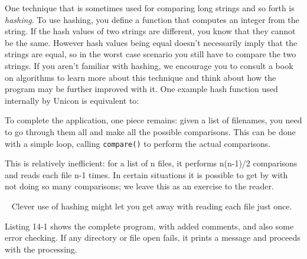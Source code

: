 One technique that is sometimes used for comparing long strings and so
forth is \textit{hashing}. To use hashing, you define a
function that computes an integer from the string. If the hash values
of two strings are different, you know that they cannot be the same.
However hash values being equal doesn't necessarily
imply that the strings are equal, so in the worst case scenario you
still have to compare the two strings. If you aren't
familiar with hashing, we encourage you to consult a book on algorithms
to learn more about this technique and think about how the program may
be further improved with it. One example hash function used internally
by Unicon is equivalent to:


To complete the application, one piece remains: given a list of
filenames, you need to go through them all and make all the possible
comparisons. This can be done with a simple loop, calling
\texttt{compare()} to perform the actual comparisons.


This is relatively inefficient: for a list of n files, it performs
n(n-1)/2 comparisons and reads each file n-1 times. In certain
situations it is possible to get by with not doing so many comparisons;
we leave this as an exercise to the reader.

\bigskip{}\
{\sffamily
Clever use of hashing might let you get away with reading each
file just once.}

Listing 14-1 shows the complete program, with added comments, and also
some error checking. If any directory or file open fails, it prints a
message and proceeds with the processing.

